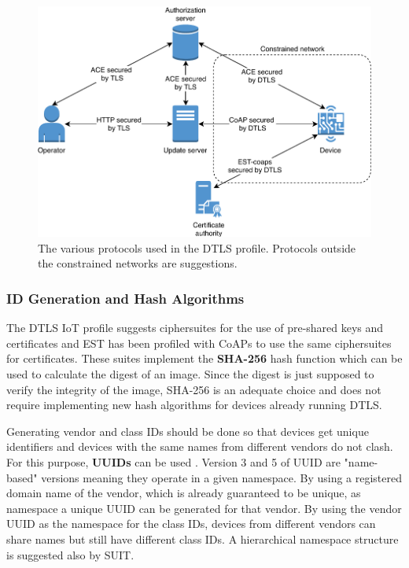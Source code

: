 \documentclass[0-thesis.tex]{subfiles}
\begin{document}
\begin{figure}[t]
    \caption{The various protocols used in the DTLS profile. Protocols outside the constrained networks are suggestions.}
    \label{fig:dtls-profile}
    \includegraphics{images/dtls-profile.pdf}
\end{figure}

\subsubsection{ID Generation and Hash Algorithms}
\label{sssec:hash-id-algorithm}
The DTLS IoT profile suggests ciphersuites for the use of pre-shared keys and certificates
and EST has been profiled with CoAPs to use the same ciphersuites for certificates. These
suites implement the \textbf{SHA-256} hash function which can be used to calculate the
digest of an image. Since the digest is just supposed to verify the integrity of the
image, SHA-256 is an adequate choice and does not require implementing new hash algorithms
for devices already running DTLS.

Generating vendor and class IDs should be done so that devices get unique identifiers and
devices with the same names from different vendors do not clash. For this purpose,
\textbf{UUIDs} can be used \parencite{rfc4122}. Version 3 and 5 of UUID are "name-based"
versions meaning they operate in a given namespace. By using a registered domain name of
the vendor, which is already guaranteed to be unique, as namespace a unique UUID can be
generated for that vendor. By using the vendor UUID as the namespace for the class IDs,
devices from different vendors can share names but still have different class IDs. A
hierarchical namespace structure is suggested also by SUIT.
\end{document}
